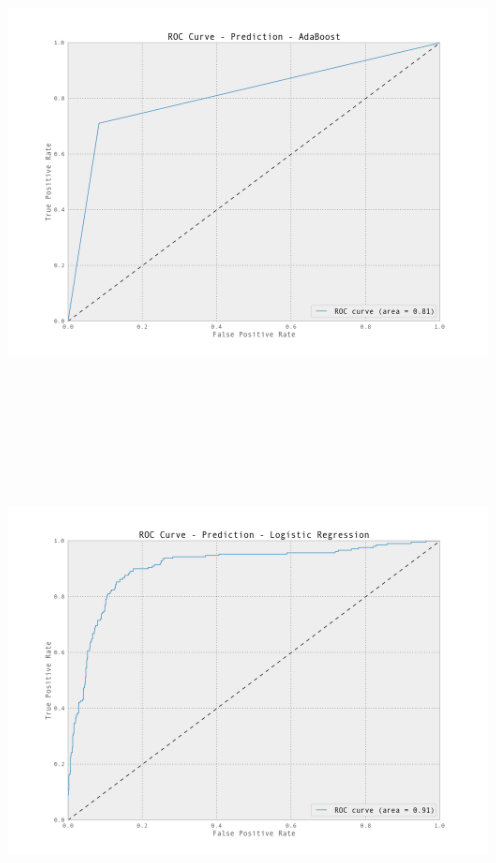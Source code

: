 \documentclass[12pt, letterpaper]{article}
\begin{document}
\begin{center}
\includegraphics[height=5in, width=5in]{roc_plot_Prediction_AdaBoost.png}
\end{center}

\begin{center}
\includegraphics[height=5in, width=5in]{roc_plot_Prediction_LogisticRegression.png}
\end{center}
\end{document}
